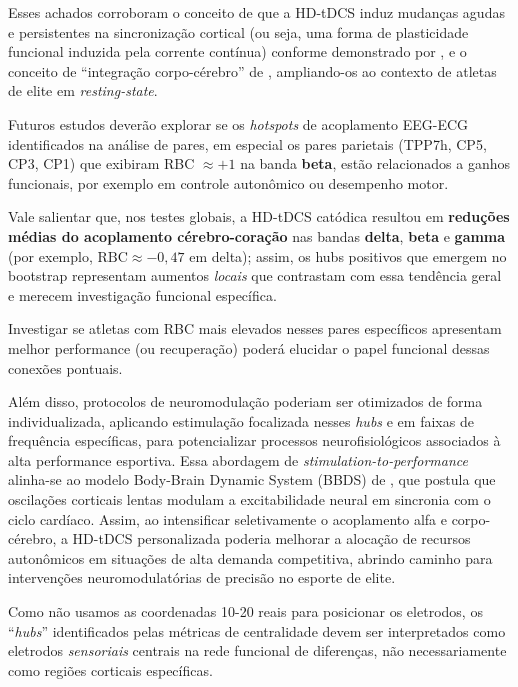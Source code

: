 Esses achados corroboram o conceito de que a HD-tDCS induz mudanças agudas e persistentes na sincronização cortical (ou seja, uma forma de plasticidade funcional induzida pela corrente contínua) conforme demonstrado por , e o conceito de ``integração corpo-cérebro'' de , ampliando-os ao contexto de atletas de elite em \textit{resting-state}.

Futuros estudos deverão explorar se os \textit{hotspots} de acoplamento EEG-ECG identificados na análise de pares, em especial os pares parietais (TPP7h, CP5, CP3, CP1) que exibiram RBC $\approx +1$ na banda \textbf{beta}, estão relacionados a ganhos funcionais, por exemplo em controle autonômico ou desempenho motor. 

Vale salientar que, nos testes globais, a HD-tDCS catódica resultou em \textbf{reduções médias do acoplamento cérebro-coração} nas bandas \textbf{delta}, \textbf{beta} e \textbf{gamma} (por exemplo, \(\mathrm{RBC}\approx -0{,}47\) em delta); assim, os hubs positivos que emergem no bootstrap representam aumentos \textit{locais} que contrastam com essa tendência geral e merecem investigação funcional específica.

Investigar se atletas com RBC mais elevados nesses pares específicos apresentam melhor performance (ou recuperação) poderá elucidar o papel funcional dessas conexões pontuais.

Além disso, protocolos de neuromodulação poderiam ser otimizados de forma individualizada, aplicando estimulação focalizada nesses \textit{hubs} e em faixas de frequência específicas, para potencializar processos neurofisiológicos associados à alta performance esportiva. Essa abordagem de \textit{stimulation-to-performance} alinha-se ao modelo Body-Brain Dynamic System (BBDS) de , que postula que oscilações corticais lentas modulam a excitabilidade neural em sincronia com o ciclo cardíaco. Assim, ao intensificar seletivamente o acoplamento alfa e corpo-cérebro, a HD-tDCS personalizada poderia melhorar a alocação de recursos autonômicos em situações de alta demanda competitiva, abrindo caminho para intervenções neuromodulatórias de precisão no esporte de elite.

Como não usamos as coordenadas 10-20 reais para posicionar os eletrodos, os ``\textit{hubs}'' identificados pelas métricas de centralidade devem ser interpretados como eletrodos \emph{sensoriais} centrais na rede funcional de diferenças, não necessariamente como regiões corticais específicas.

